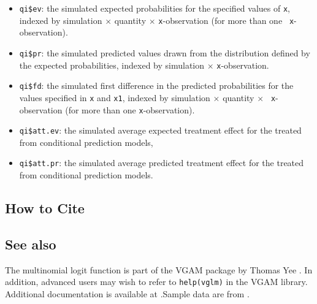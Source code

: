 \begin{itemize}
   \begin{itemize}
   \item {\tt qi\$ev}: the simulated expected probabilities for the
     specified values of {\tt x}, indexed by simulation $\times$
     quantity $\times$ {\tt x}-observation (for more than one {\tt
       x}-observation).
   \item {\tt qi\$pr}: the simulated predicted values drawn from the
     distribution defined by the expected probabilities, indexed by
     simulation $\times$ {\tt x}-observation.
   \item {\tt qi\$fd}: the simulated first difference in the predicted
     probabilities for the values specified in {\tt x} and {\tt x1},
     indexed by simulation $\times$ quantity $\times$ {\tt
       x}-observation (for more than one {\tt x}-observation).
   \item {\tt qi\$att.ev}: the simulated average expected treatment
     effect for the treated from conditional prediction models, 
   \item {\tt qi\$att.pr}: the simulated average predicted treatment
     effect for the treated from conditional prediction models.  
   \end{itemize}
\end{itemize}

\subsection*{How to Cite}


\subsection*{See also}
The multinomial logit function is part of the VGAM package by Thomas Yee \citep{YeeHas03}. In addition, advanced users may wish to refer to \texttt{help(vglm)} 
in the VGAM library.  Additional documentation is available at
.Sample data are from \cite{KinTomWit00}.
